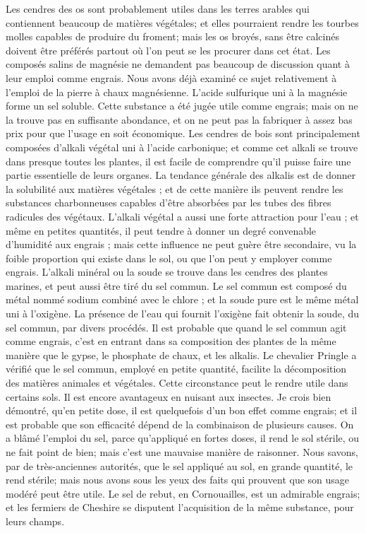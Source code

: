 Les cendres des os sont probablement utiles dans les terres arables qui contiennent beaucoup de matières végétales; et elles pourraient rendre les tourbes molles capables de produire du froment; mais les os broyés, sans être calcinés doivent être préférés partout où l'on peut se les procurer dans cet état.
Les composés salins de magnésie ne demandent pas beaucoup de discussion quant à leur emploi comme engrais. Nous avons déjà examiné ce sujet relativement à l'emploi de la pierre à chaux magnésienne. L'acide sulfurique uni à la magnésie forme un sel soluble. Cette substance a été jugée utile comme engrais; mais on ne la trouve pas en suffisante abondance, et on ne peut pas la fabriquer à assez bas prix pour que l'usage en soit économique.
\setcounter{page}{242} Les cendres de bois sont principalement composées d'alkali végétal uni à l'acide carbonique; et comme cet alkali se trouve dans presque toutes les plantes, il est facile de comprendre qu'il puisse faire une partie essentielle de leurs organes. La tendance générale des alkalis est de donner la solubilité aux matières végétales ; et de cette manière ils peuvent rendre les substances charbonneuses capables d'être absorbées par les tubes des fibres radicules des végétaux. L'alkali végétal a aussi une forte attraction pour l'eau ; et même en petites quantités, il peut tendre à donner un degré convenable d'humidité aux engrais ; mais cette influence ne peut guère être secondaire, vu la foible proportion qui existe dans le sol, ou que l'on peut y employer comme engrais.
L'alkali minéral ou la soude se trouve dans les cendres des plantes marines, et peut aussi être tiré du sel commun. Le sel commun est composé du métal nommé sodium combiné avec le chlore ; et la soude pure est le même métal uni à l'oxigène. La présence de l'eau qui fournit l'oxigène fait obtenir la soude, du sel commun, par divers procédés.
Il est probable que quand le sel commun agit comme engrais, c'est en entrant dans sa\setcounter{page}{243} composition des plantes de la même manière que le gypse, le phosphate de chaux, et les alkalis. Le chevalier Pringle a vérifié que le sel commun, employé en petite quantité, facilite la décomposition des matières animales et végétales. Cette circonstance peut le rendre utile dans certains sols. Il est encore avantageux en nuisant aux insectes. Je crois bien démontré, qu'en petite dose, il est quelquefois d'un bon effet comme engrais; et il est probable que son efficacité dépend de la combinaison de plusieurs causes.
On a blâmé l'emploi du sel, parce qu'appliqué en fortes doses, il rend le sol stérile, ou ne fait point de bien; mais c'est une mauvaise manière de raisonner. Nous savons, par de très-anciennes autorités, que le sel appliqué au sol, en grande quantité, le rend stérile; mais nous avons sous les yeux des faits qui prouvent que son usage modéré peut être utile. Le sel de rebut, en Cornouailles, est un admirable engrais; et les fermiers de Cheshire se disputent l'acquisition de la même substance, pour leurs champs.
